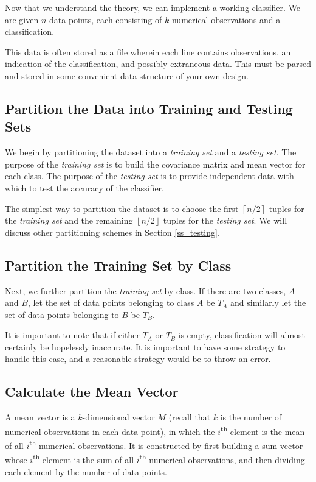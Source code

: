 \documentclass{article}
\newcommand{\floor}[1]{\left\lfloor#1\right\rfloor}
\newcommand{\ceil}[1]{\left\lceil#1\right\rceil}
\begin{document}
Now that we understand the theory, we can implement a working
classifier.  We are given $n$ data points, each consisting of $k$
numerical observations and a classification.

This data is often stored as a file wherein each line contains
observations, an indication of the classification, and possibly
extraneous data.  This must be parsed and stored in some convenient
data structure of your own design.

\subsection{Partition the Data into Training and Testing Sets}

We begin by partitioning the dataset into a \emph{training set} and a
\emph{testing set}.  The purpose of the \emph{training set} is to
build the covariance matrix and mean vector for each class.  The
purpose of the \emph{testing set} is to provide independent data with
which to test the accuracy of the classifier.

The simplest way to partition the dataset is to choose the first
$\ceil{n/2}$ tuples for the \emph{training set} and the remaining
$\floor{n/2}$ tuples for the \emph{testing set}.  We will discuss
other partitioning schemes in Section \ref{ss_testing}.

\subsection{Partition the Training Set by Class}

Next, we further partition the \emph{training set} by class.  If there
are two classes, $A$ and $B$, let the set of data points belonging to
class $A$ be $T_A$ and similarly let the set of data points belonging
to $B$ be $T_B$.

It is important to note that if either $T_A$ or $T_B$ is empty,
classification will almost certainly be hopelessly inaccurate.  It is
important to have some strategy to handle this case, and a reasonable
strategy would be to throw an error.

\subsection{Calculate the Mean Vector}

A mean vector is a $k$-dimensional vector $M$ (recall that $k$ is the number
of numerical observations in each data point), in which the
$i$\textsuperscript{th} element is the mean of all $i$\textsuperscript{th}
numerical observations. It is constructed by first building a sum vector whose
$i$\textsuperscript{th} element is the sum of all $i$\textsuperscript{th}
numerical observations, and then dividing each element by the number of data
points.
\end{document}
